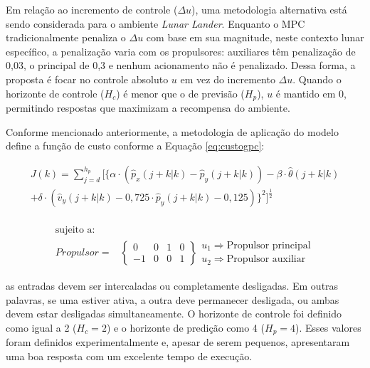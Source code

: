 \documentclass[12pt,           %
a4paper,                       %
openany,                       %
oneside,                       %
chapter=TITLE,                 %
english,                       %
spanish,                       %
brazil,                        %
sumario=tradicional]{abntex2}  %
\begin{document}
\begin{OnehalfSpace}
Em relação ao incremento de controle ($\Delta u$), uma metodologia alternativa está sendo considerada para o ambiente \textit{Lunar Lander}. Enquanto o MPC tradicionalmente penaliza o $\Delta u$ com base em sua magnitude, neste contexto lunar específico, a penalização varia com os propulsores: auxiliares têm penalização de 0,03, o principal de 0,3 e nenhum acionamento não é penalizado. Dessa forma, a proposta é focar no controle absoluto $u$ em vez do incremento $\Delta u$. Quando o horizonte de controle ($H_c$) é menor que o de previsão ($H_p$), $u$ é mantido em 0, permitindo respostas que maximizam a recompensa do ambiente.

Conforme mencionado anteriormente, a metodologia de aplicação do modelo define a função de custo conforme a Equação \ref{eq:custogpc}:

\begin{equation}
\label{eq:custogpc}
\begin{matrix}
    J(k) = \sum_{j=d}^{h_p}[\{\alpha\cdot (\hat{p}_x(j+k|k) - \hat{p}_y(j+k|k) )-\beta \cdot \hat{\theta}(j+k|k)\\
            +\delta \cdot  (\hat{v}_y(j+k|k)-0,725\cdot\hat{p}_y(j+k|k)-0,125)\}^2]^\frac{1}{2}\\
\end{matrix}
\end{equation}

\begin{equation*}
\begin{matrix}
  \text{sujeito a:} &  \\
  	Propulsor = & 
  	\left\{
  	\begin{matrix}
  	0  & 0 & 1 & 0 \\
   -1  & 0 & 0 & 1
	\end{matrix}  	
	\right\} 
	\begin{matrix}
  	u_1 \Rightarrow\text{Propulsor principal}\\
    u_2 \Rightarrow\text{Propulsor auxiliar}
	\end{matrix}
\end{matrix}
\end{equation*}

\noindent as entradas devem ser intercaladas ou completamente desligadas. Em outras palavras, se uma estiver ativa, a outra deve permanecer desligada, ou ambas devem estar desligadas simultaneamente. O horizonte de controle foi definido como igual a 2 ($H_c=2$) e o horizonte de predição como 4 ($H_p=4$). Esses valores foram definidos experimentalmente e, apesar de serem pequenos, apresentaram uma boa resposta com um excelente tempo de execução.


\end{OnehalfSpace}
\end{document}
